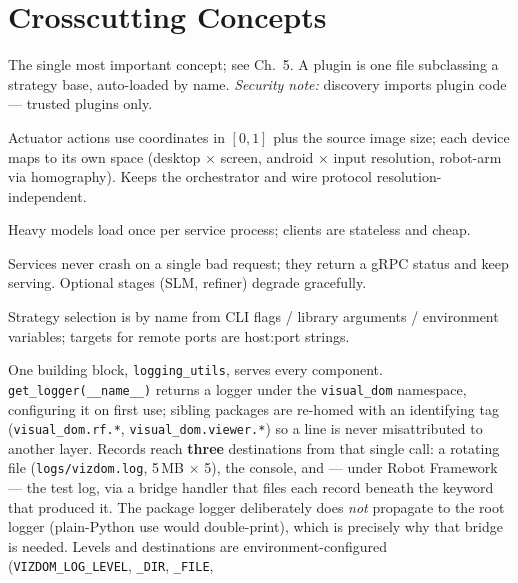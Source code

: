 \documentclass[11pt,a4paper]{report}
\newcommand{\code}[1]{\texttt{#1}}
\begin{document}
\chapter{Crosscutting Concepts}
\begin{description}[leftmargin=0pt,style=nextline]
  \item[Extensibility (strategy + registry + auto-discovery)] The single most
    important concept; see Ch.~5. A plugin is one file subclassing a strategy base,
    auto-loaded by name. \emph{Security note:} discovery imports plugin code ---
    trusted plugins only.
  \item[Normalised coordinate contract] Actuator actions use coordinates in $[0,1]$
    plus the source image size; each device maps to its own space (desktop $\times$
    screen, android $\times$ input resolution, robot-arm via homography). Keeps the
    orchestrator and wire protocol resolution-independent.
  \item[Warm-model services] Heavy models load once per service process; clients are
    stateless and cheap.
  \item[Error handling] Services never crash on a single bad request; they return a
    gRPC status and keep serving. Optional stages (SLM, refiner) degrade gracefully.
  \item[Configuration] Strategy selection is by name from CLI flags / library
    arguments / environment variables; targets for remote ports are host:port
    strings.
  \item[Logging and observability] One building block, \code{logging\_utils},
    serves every component. \code{get\_logger(\_\_name\_\_)} returns a logger under
    the \code{visual\_dom} namespace, configuring it on first use; sibling packages
    are re-homed with an identifying tag (\code{visual\_dom.rf.*},
    \code{visual\_dom.viewer.*}) so a line is never misattributed to another layer.
    Records reach \textbf{three} destinations from that single call: a rotating
    file (\code{logs/vizdom.log}, 5\,MB $\times$ 5), the console, and --- under
    Robot Framework --- the test log, via a bridge handler that files each record
    beneath the keyword that produced it. The package logger deliberately does
    \emph{not} propagate to the root logger (plain-Python use would double-print),
    which is precisely why that bridge is needed. Levels and destinations are
    environment-configured (\code{VIZDOM\_LOG\_LEVEL}, \code{\_DIR}, \code{\_FILE},

\end{description}
\end{document}
